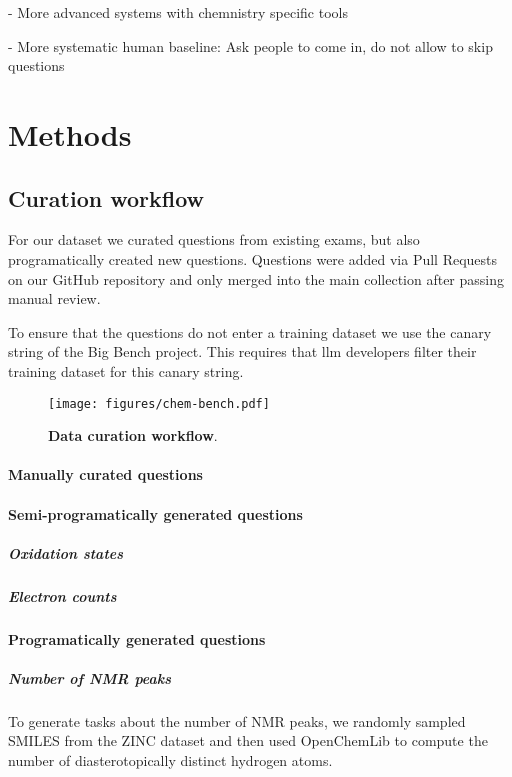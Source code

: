 \documentclass[11pt, oneside]{article}
\begin{document}
- More advanced systems with chemnistry specific tools 

- More systematic human baseline: Ask people to come in, do not allow to skip questions

\section{Methods}

\subsection{Curation workflow} \label{sec:curation}
For our dataset we curated questions from existing exams, but also programatically created new questions. Questions were added via Pull Requests on our GitHub repository and only merged into the main collection after passing manual review.

To ensure that the questions do not enter a training dataset we use the canary string of the Big Bench project. This requires that \Gls{llm} developers filter their training dataset for this canary string.  

\begin{figure}
    \texttt{[image: figures/chem-bench.pdf]}
        \caption{\textbf{Data curation workflow}.}
\end{figure}

\paragraph{Manually curated questions}

\paragraph{Semi-programatically generated questions}

\subparagraph{Oxidation states}

\subparagraph{Electron counts}

\paragraph{Programatically generated questions} 
\subparagraph{Number of NMR peaks} To generate tasks about the number of NMR peaks, we randomly sampled SMILES from the ZINC dataset and then used OpenChemLib\cite{openchemlib} to compute the number of diasterotopically distinct hydrogen atoms. 
\end{document}
